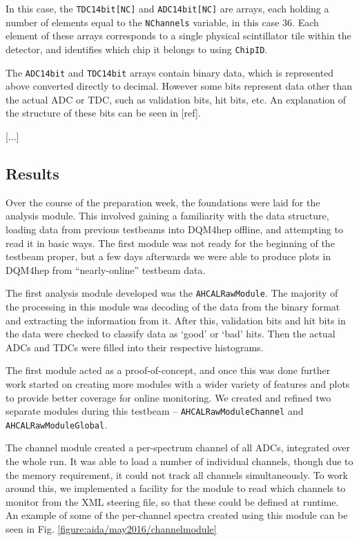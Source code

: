 In this case, the \texttt{TDC14bit[NC]} and \texttt{ADC14bit[NC]} are arrays, each holding a number of elements equal to the \texttt{NChannels} variable, in this case 36. Each element of these arrays corresponds to a single physical scintillator tile within the detector, and identifies which chip it belongs to using \texttt{ChipID}. 

The \texttt{ADC14bit} and \texttt{TDC14bit} arrays contain binary data, which is represented above converted directly to decimal. However some bits represent data other than the actual ADC or TDC, such as validation bits, hit bits, etc. An explanation of the structure of these bits can be seen in [ref]. %

[...]

\subsection{Results}
Over the course of the preparation week, the foundations were laid for the analysis module. This involved gaining a familiarity with the data structure, loading data from previous testbeams into DQM4hep offline, and attempting to read it in basic ways. The first module was not ready for the beginning of the testbeam proper, but a few days afterwards we were able to produce plots in DQM4hep from ``nearly-online'' testbeam data.

The first analysis module developed was the \texttt{AHCALRawModule}. The majority of the processing in this module was decoding of the data from the binary format and extracting the information from it. After this, validation bits and hit bits in the data were checked to classify data as `good' or `bad' hits. Then the actual ADCs and TDCs were filled into their respective histograms. 

The first module acted as a proof-of-concept, and once this was done further work started on creating more modules with a wider variety of features and plots to provide better coverage for online monitoring. We created and refined two separate modules during this testbeam -- \texttt{AHCALRawModuleChannel} and \texttt{AHCALRawModuleGlobal}. 

The channel module created a per-spectrum channel of all ADCs, integrated over the whole run. It was able to load a number of individual channels, though due to the memory requirement, it could not track all channels simultaneously. To work around this, we implemented a facility for the module to read which channels to monitor from the XML steering file, so that these could be defined at runtime. An example of some of the per-channel spectra created using this module can be seen in Fig. \ref{figure:aida/may2016/channelmodule}

